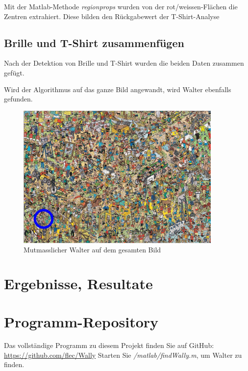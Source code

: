 \documentclass[paper=a4,fontsize=12pt]{scrartcl}
\begin{document}
\noindent Mit der Matlab-Methode \emph{regionprops} wurden von der rot/weissen-Flächen die Zentren extrahiert. Diese bilden den Rückgabewert der T-Shirt-Analyse
\newpage

\subsection*{Brille und T-Shirt zusammenfügen}
Nach der Detektion von Brille und T-Shirt wurden die beiden Daten zusammen gefügt.


\noindent Wird der Algorithmus auf das ganze Bild angewandt, wird Walter ebenfalls gefunden.
\begin{figure}[htbp] 
\centering
  \includegraphics[width=0.9\textwidth]{img/findWallyFull.jpg}
  \caption{Mutmasslicher Walter auf dem gesamten Bild}
  \label{fig:Bild1}
\end{figure}

\newpage
\section*{Ergebnisse, Resultate}

\section*{Programm-Repository}
Das vollständige Programm zu diesem Projekt finden Sie auf GitHub:\newline
\url{https://github.com/flec/Wally}\newline
Starten Sie \mbox{\emph{/matlab/findWally.m}}, um Walter zu finden.
\end{document}
